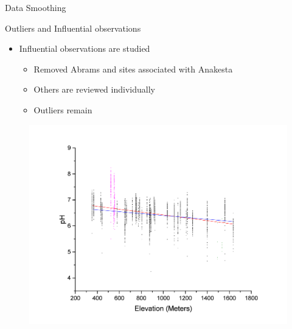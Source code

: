 \begin{frame}{Data Smoothing}

\begin{block}{Outliers and Influential observations}
	\begin{itemize}
		\item Influential observations are studied
			\begin{itemize}
				\item Removed Abrams and sites associated with Anakesta
				\item Others are reviewed individually
				\item Outliers remain
			\end{itemize}		
	\end{itemize}
\end{block}
 
\begin{figure}
\centering			
\includegraphics[width=.60\textwidth]{Figures/pHdata}
\end{figure}
		
\end{frame}